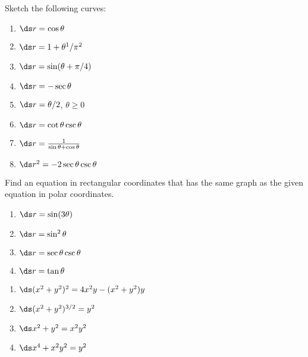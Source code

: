 \begin{enumialphparenastyle}
\begin{ex}
Sketch the following curves:
\begin{multicols}{2}
\begin{enumerate}
	\item	$\ds r=\cos\theta$
	\item	$\ds r=1+\theta^1/\pi^2$
	\item	$\ds r=\sin(\theta+\pi/4)$
	\item	$\ds r=-\sec\theta$
	\item	$\ds r=\theta/2$, $\theta\ge0$
	\item	$\ds r=\cot\theta\csc\theta$
	\item	$\ds r={1\over\sin\theta+\cos\theta}$
	\item	$\ds r^2=-2\sec\theta\csc\theta$
\end{enumerate}
\end{multicols}
\end{ex}

\begin{ex}
Find an equation in rectangular coordinates that has the same
graph as the given equation in polar coordinates.
\begin{multicols}{2}
\begin{enumerate}
	\item	$\ds r=\sin(3\theta)$
	\item	$\ds r=\sin^2\theta$
	\item	$\ds r=\sec\theta\csc\theta$
	\item	$\ds r=\tan\theta$
\end{enumerate}
\end{multicols}
\begin{sol}
\begin{multicols}{2}
\begin{enumerate}
	\item	$\ds (x^2+y^2)^2=4x^2y-(x^2+y^2)y$
	\item	$\ds (x^2+y^2)^{3/2}=y^2$
	\item	$\ds x^2+y^2=x^2y^2$
	\item	$\ds x^4+x^2y^2=y^2$
\end{enumerate}
\end{multicols}
\end{sol}
\end{ex}

\end{enumialphparenastyle}
